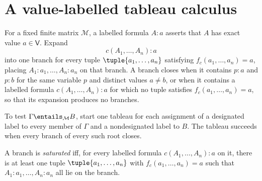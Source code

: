 \section{A value-labelled tableau calculus}
\label{sec:many-valued-paraconsistent-02}

For a fixed finite matrix \(\mathcal M\), a labelled formula \(A{:}a\) asserts
that \(A\) has exact value \(a\in\mathsf V\).  Expand
\[
  c(A_1,\ldots,A_n){:}a
\]
into one branch for every tuple \(\tuple{a_1,\ldots,a_n}\) satisfying
\(f_c(a_1,\ldots,a_n)=a\), placing
\(A_1{:}a_1,\ldots,A_n{:}a_n\) on that branch.  A branch closes when it
contains \(p{:}a\) and \(p{:}b\) for the same variable \(p\) and distinct
values \(a\ne b\), or when it contains a labelled formula
\(c(A_1,\ldots,A_n){:}a\) for which no tuple satisfies
\(f_c(a_1,\ldots,a_n)=a\), so that its expansion produces no branches.

To test \(\Gamma\entails_{\mathcal M}B\), start one tableau for each assignment
of a designated label to every member of \(\Gamma\) and a nondesignated label
to \(B\).  The tableau succeeds when every branch of every such root closes.

\begin{definition}
A branch is \emph{saturated} iff, for every labelled formula
\(c(A_1,\ldots,A_n){:}a\) on it, there is at least one tuple
\(\tuple{a_1,\ldots,a_n}\) with \(f_c(a_1,\ldots,a_n)=a\) such that
\(A_1{:}a_1,\ldots,A_n{:}a_n\) all lie on the branch.
\end{definition}

